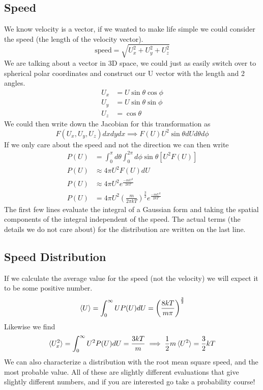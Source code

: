 \documentclass{article}
\begin{document}
\subsection*{Speed}
We know velocity is a vector, if we wanted to make life simple we could consider the speed (the length of the velocity vector).
\begin{equation}
    \text{speed} = \sqrt{U_x^2 + U_y^2 + U_z^2}
\end{equation}
We are talking about a vector in 3D space, we could just as easily switch over to spherical polar coordinates and construct our U vector with the length and 2 angles. 
\begin{equation}
    \begin{split}
        U_x &= U \sin\theta\cos\phi \\
        U_y &= U\sin\theta\sin\phi\\
        U_z &=\cos\theta
    \end{split}
\end{equation}
We could then write down the Jacobian for this transformation as 
\begin{equation}
        F(U_x,U_y,U_z)dxdydx \implies F(U)U^2\sin\theta dUd\theta d\phi
\end{equation}
If we only care about the speed and not the direction we can then write 
\begin{equation}
\begin{split}
    P(U) &= \int_0^\pi d\theta\int_0^{2\pi}d\phi \sin\theta \left[U^2F(U)\right]\\
    P(U) &\approx 4\pi U^2 F(U)dU \\
    P(U) &\approx 4\pi U^2 e^{\frac{-mU^2}{2kT}}\\
    P(U) &= 4\pi U^2 \left(\frac{m}{2\pi kT}\right)^{\frac{3}{2}} e^{\frac{-mU^2}{2kT}}
    \end{split}
\end{equation}
The first few lines evaluate the integral of a Gaussian form and taking the spatial components of the integral independent of the speed. 
The actual terms (the details we do not care about) for the distribution are written on the last line. 

\subsection*{Speed Distribution}
If we calculate the average value for the speed (not the velocity) we will expect it to be some positive number. 
\begin{equation}
\braket{U} = \int_0^\infty U P(U) dU = \left(\frac{8kT}{m\pi}\right)^{\frac{3}{2}}
\end{equation}
Likewise we find 
\begin{equation}
\braket{U_x^2} = \int_0^\infty U^2 P(U) dU = \frac{3kT}{m} \implies \frac{1}{2}m\braket{U^2} = \frac{3}{2}kT
\end{equation}
We can also characterize a distribution with the root mean square speed, and the most probable value. 
All of these are slightly different evaluations that give slightly different numbers, and if you are interested go take a probability course!
\end{document}
